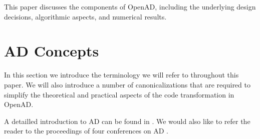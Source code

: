 \documentclass[acmtocl,acmnow]{acmtrans2m}
\newcommand{\OpenAD}{OpenAD}
\begin{document}
This paper discusses the components of \OpenAD,
including the underlying design decisions, algorithmic aspects, and
numerical results.
 
\section{AD Concepts}\label{sec:ADIntro}

In this section we introduce the terminology we will refer to throughout 
this paper. We will also introduce a number of canonicalizations 
that are required to simplify the theoretical and practical 
aspects of the code transformation in \OpenAD.

A detailled introduction to AD can be found in \cite{Gri00}. 
We would also like to refer the reader to the proceedings of four conferences 
on AD \cite{CG91,BBCG96,CFG+01,BCH+05}.
\end{document}
